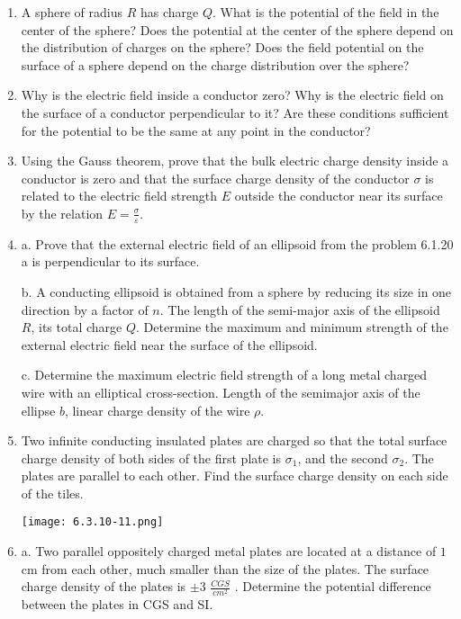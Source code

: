 \documentclass{article}
\begin{document}
\begin{enumerate}[label=6.3.\arabic*]
\item A sphere of radius $R$ has charge $Q$. What is the potential of the field in the center of the sphere? Does the potential at the center of the sphere depend on the distribution of charges on the sphere? Does the field potential on the surface of a sphere depend on the charge distribution over the sphere?

\item Why is the electric field inside a conductor zero? Why is the electric field on the surface of a conductor perpendicular to it? Are these conditions sufficient for the potential to be the same at any point in the conductor?

\item Using the Gauss theorem, prove that the bulk electric charge density inside a conductor is zero and that the surface charge density of the conductor $\sigma$ is related to the electric field strength $E$ outside the conductor near its surface by the relation $E = \frac{\sigma}{\varepsilon}$.

\item a. Prove that the external electric field of an ellipsoid from the problem 6.1.20 a is perpendicular to its surface.

b. A conducting ellipsoid is obtained from a sphere by reducing its size in one direction by a factor of $n$. The length of the semi-major axis of the ellipsoid $R$, its total charge $Q$. Determine the maximum and minimum strength of the external electric field near the surface of the ellipsoid. 

c. Determine the maximum electric field strength of a long metal charged wire with an elliptical cross-section. Length of the semimajor axis of the ellipse $b$, linear charge density of the wire $\rho$.

\item Two infinite conducting insulated plates are charged so that the total surface charge density of both sides of the first plate is $\sigma_1$, and the second $\sigma_2$. The plates are parallel to each other. Find the surface charge density on each side of the tiles.

\begin{center}
    \texttt{[image: 6.3.10-11.png]}
\end{center}

\item a. Two parallel oppositely charged metal plates are located at a distance of $1$ cm from each other, much smaller than the size of the plates. The surface charge density of the plates is $\pm 3$ $\frac{CGS}{cm^2}$ . Determine the potential difference between the plates in CGS and SI. 


\end{enumerate}
\end{document}
